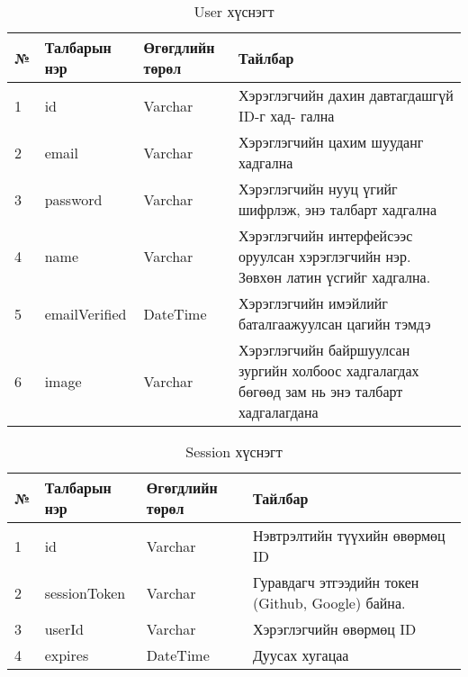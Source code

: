 
\begin{table}[h]
	\caption{User хүснэгт}
	\begin{tabular}{|l|l|l|p{8cm}|}
	\hline
	№ &  Талбарын нэр & Өгөгдлийн төрөл & Тайлбар \\ \hline
	1 &  id & Varchar & Хэрэглэгчийн дахин давтагдашгүй ID-г хад-
	гална\\ \hline
	2 &  email & Varchar & Хэрэглэгчийн цахим шууданг хадгална\\ \hline
	3 &  password & Varchar & Хэрэглэгчийн нууц үгийг шифрлэж, энэ талбарт хадгална \\ \hline
    4 &  name & Varchar & Хэрэглэгчийн интерфейсээс оруулсан хэрэглэгчийн нэр. Зөвхөн латин үсгийг хадгална. \\ \hline
	5 &  emailVerified & DateTime & Хэрэглэгчийн имэйлийг баталгаажуулсан цагийн тэмдэ \\ \hline
	6 &  image & Varchar & Хэрэглэгчийн байршуулсан зургийн холбоос хадгалагдах бөгөөд зам нь энэ талбарт хадгалагдана \\ \hline
\end{tabular}
\end{table}

\begin{table}[h]
	\caption{Session хүснэгт}
	\begin{tabular}{|l|l|l|p{8cm}|}
	\hline
	№ &  Талбарын нэр & Өгөгдлийн төрөл & Тайлбар \\ \hline
	1 &  id & Varchar & Нэвтрэлтийн түүхийн өвөрмөц ID \\ \hline
	2 &  sessionToken & Varchar & Гуравдагч этгээдийн токен (Github, Google) байна. \\ \hline
	3 &  userId & Varchar & Хэрэглэгчийн өвөрмөц ID \\ \hline
	4 &  expires & DateTime & Дуусах хугацаа \\ \hline
\end{tabular}
\end{table}

